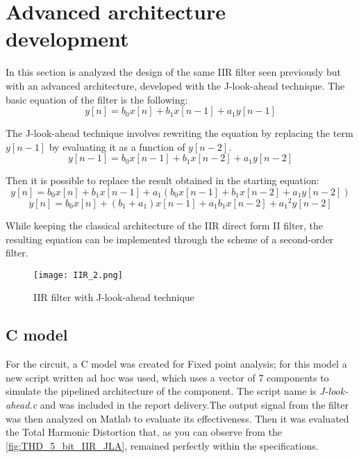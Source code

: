 \section{Advanced architecture development}
\graphicspath{{sec3/images/}}
In this section is analyzed the design of the same IIR filter seen previously but with an advanced architecture, developed with the J-look-ahead technique. The basic equation of the filter is the following:
$$ y[n] = b_0x[n] + b_1x[n-1] + a_1y[n-1]$$

The J-look-ahead technique involves rewriting the equation by replacing the term $y[n-1]$ by evaluating it as a function of $y[n-2]$.
$$ y[n-1] = b_0x[n-1] + b_1x[n-2] + a_1y[n-2]$$

Then it is possible to replace the result obtained in the starting equation:
$$ y[n] = b_0x[n] + b_1x[n-1] + a_1(b_0x[n-1] + b_1x[n-2] + a_1y[n-2])$$
$$ y[n] = b_0x[n] + (b_1 + a_1)x[n-1] + a_1b_1x[n-2] + {a_1}^{2}y[n-2]$$

While keeping the classical architecture of the IIR direct form II filter, the resulting equation can be implemented through the scheme of a second-order filter.

\begin{figure}[h]
	\center
	\texttt{[image: IIR\_2.png]}
	\caption{IIR filter with J-look-ahead technique}
	\label{fig:IIR_advanced}
\end{figure}

\subsection{C model}

For the circuit, a C model was created for Fixed point analysis; for this model a new script written ad hoc was used, which uses a vector of 7 components to simulate the pipelined architecture of the component. The script name is \textit{J-look-ahead.c} and was included in the report delivery.The output signal from the filter was then analyzed on Matlab to evaluate its effectiveness. Then it was evaluated the Total Harmonic Distortion that, as you can observe from the \autoref{fig:THD_5_bit_IIR_JLA}, remained perfectly within the specifications.






